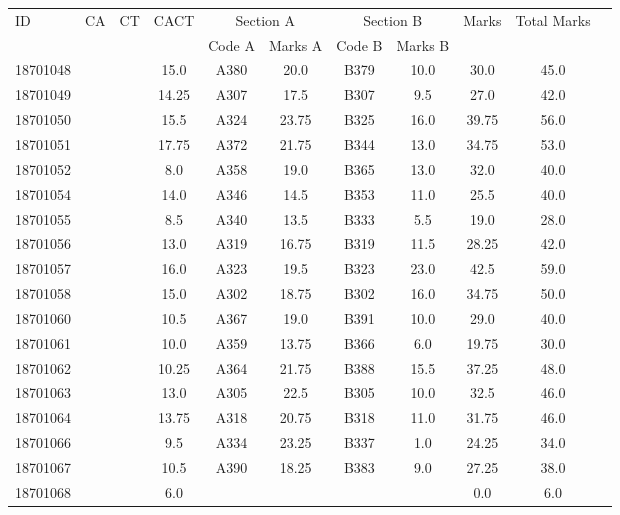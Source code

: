 \documentclass[12pt]{article}
\begin{document}
    \begin{center} 
	\renewcommand{\arraystretch}{1.08}
	\begin{small}
    \begin{tabular}{|l|c|c|c|c|c|c|c|c|c|c|} \hline
	\multirow{2}{*}{ID} & 	\multirow{2}{*}{CA}  & 	\multirow{2}{*}{CT}  & 	\multirow{2}{*}{CACT}  & \multicolumn{2 }{|c|}{Section A}& \multicolumn{2 }{c|}{Section B} & 	\multirow{2}{*}{Marks}  & 	\multirow{2}{*}{Total Marks}  \\ 
	&  &  &  & Code A & Marks A & Code B & Marks B&  &  \\ \hline
18701048 &  &  & 15.0 & A380 & 20.0 & B379 & 10.0 & 30.0 & 45.0\\ \hline 
18701049 &  &  & 14.25 & A307 & 17.5 & B307 & 9.5 & 27.0 & 42.0\\ \hline 
18701050 &  &  & 15.5 & A324 & 23.75 & B325 & 16.0 & 39.75 & 56.0\\ \hline 
18701051 &  &  & 17.75 & A372 & 21.75 & B344 & 13.0 & 34.75 & 53.0\\ \hline 
18701052 &  &  & 8.0 & A358 & 19.0 & B365 & 13.0 & 32.0 & 40.0\\ \hline 
18701054 &  &  & 14.0 & A346 & 14.5 & B353 & 11.0 & 25.5 & 40.0\\ \hline 
18701055 &  &  & 8.5 & A340 & 13.5 & B333 & 5.5 & 19.0 & 28.0\\ \hline 
18701056 &  &  & 13.0 & A319 & 16.75 & B319 & 11.5 & 28.25 & 42.0\\ \hline 
18701057 &  &  & 16.0 & A323 & 19.5 & B323 & 23.0 & 42.5 & 59.0\\ \hline 
18701058 &  &  & 15.0 & A302 & 18.75 & B302 & 16.0 & 34.75 & 50.0\\ \hline 
18701060 &  &  & 10.5 & A367 & 19.0 & B391 & 10.0 & 29.0 & 40.0\\ \hline 
18701061 &  &  & 10.0 & A359 & 13.75 & B366 & 6.0 & 19.75 & 30.0\\ \hline 
18701062 &  &  & 10.25 & A364 & 21.75 & B388 & 15.5 & 37.25 & 48.0\\ \hline 
18701063 &  &  & 13.0 & A305 & 22.5 & B305 & 10.0 & 32.5 & 46.0\\ \hline 
18701064 &  &  & 13.75 & A318 & 20.75 & B318 & 11.0 & 31.75 & 46.0\\ \hline 
18701066 &  &  & 9.5 & A334 & 23.25 & B337 & 1.0 & 24.25 & 34.0\\ \hline 
18701067 &  &  & 10.5 & A390 & 18.25 & B383 & 9.0 & 27.25 & 38.0\\ \hline 
18701068 &  &  & 6.0 &  &  &  &  & 0.0 & 6.0\\ \hline 

\end{tabular}
\end{small}
\end{center}
\end{document}
